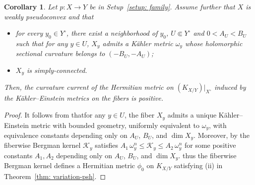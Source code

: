 \documentclass[a4paper, 11pt]{amsart}
\theoremstyle{plain}
\numberwithin{equation}{section} %
\numberwithin{figure}{section} %
\theoremstyle{plain}
\theoremstyle{plain}
\newtheorem{corollary}[theorem]{Corollary} %
\theoremstyle{plain}
\theoremstyle{plain}
\theoremstyle{remark}
\theoremstyle{definition}
\theoremstyle{definition}
\newcommand{\K}{\mathcal{K}}
\begin{document}
\begin{corollary}
 Let $p:X\to Y$ be in Setup~\ref{setup: family}.  Assume further that  $X$ is weakly pseudoconvex and that
\begin{itemize}
    \item[(i)] for every $y_0\in Y^\circ$, there exist a neighborhood of $y_0$, $U\Subset Y^\circ$ and $0<A_U< B_U$  such that for any $y\in U$, $X_y$ admits a K\"ahler metric $\omega_y$ whose holomorphic sectional curvature belongs to $(-B_U, -A_U)$;   
    \item[(ii)] $X_y$ is simply-connected. 
\end{itemize}
Then, the curvature current of the Hermitian metric on $(K_{X/Y})|_{X^\circ}$ induced by the K\"ahler--Einstein metrics on the fibers is positive. 
\end{corollary}
\begin{proof}
  It follows from \cite[Corollary 7]{Wu-Yau20invariant} thatfor any $y\in U$, the fiber $X_y$ admits a unique K\"ahler--Einstein metric with bounded geometry, uniformly equivalent to $\omega_y$, with equivalence constants depending only on $A_U$, $B_U$, and $\dim X_y$. Moreover, by \cite[p. 144, Theorem H (3)]{Greene_Wu} the fiberwise Bergman kernel $\K_y$ satisfies $A_1\,\omega_y^n \le \K_y \le A_2\,\omega_y^n$ for some positive constants $A_1,A_2$ depending only on $A_U$, $B_U$, and $\dim X_y$.  thus the fiberwise Bergman kernel defines a Hermitian metric $\phi_0$ on $K_{X/Y}$ satisfying (ii) in Theorem~\ref{thm: variation-psh}. 
\end{proof}
\end{document}

